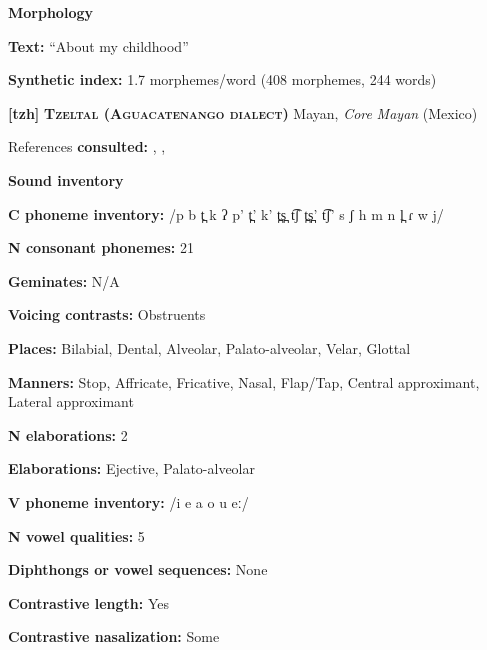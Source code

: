 \textbf{Morphology}



\textbf{Text:} “About my childhood” \citep[248-250]{Yumitani1998}



\textbf{Synthetic index:} 1.7 morphemes/word (408 morphemes, 244 words)



\textbf{[tzh]}   \textbf{\textsc{Tzeltal (Aguacatenango dialect)}}  Mayan, \textit{Core} \textit{Mayan} (Mexico)



References \textbf{consulted:} \citet{Kaufman1971}, \citet{Polian2006}, \citet{Smith2007}



\textbf{Sound inventory}



\textbf{C phoneme inventory:} /p b t̪ k ʔ p’ t̪’ k’ t̪s̪ t͡ʃ t̪s̪’ t͡ʃ’ s ʃ h m n l̪ ɾ w j/



\textbf{N consonant phonemes:} 21



\textbf{Geminates:} N/A



\textbf{Voicing contrasts:} Obstruents



\textbf{Places:} Bilabial, Dental, Alveolar, Palato-alveolar, Velar, Glottal



\textbf{Manners:} Stop, Affricate, Fricative, Nasal, Flap/Tap, Central approximant, Lateral approximant



\textbf{N elaborations:} 2



\textbf{Elaborations:} Ejective, Palato-alveolar



\textbf{V phoneme inventory:} /i e a o u eː/



\textbf{N vowel qualities:} 5



\textbf{Diphthongs or vowel sequences:} None



\textbf{Contrastive length:} Yes



\textbf{Contrastive nasalization:} Some



